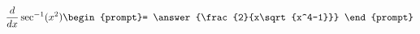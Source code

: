\documentclass{ximera}
\author{Steven Gubkin}
\begin{document}
\begin{exercise}

\[
\frac{d}{dx} \sec^{-1}(x^2) \begin{prompt}= \answer{\frac{2}{x\sqrt{x^4-1}}}
\end{prompt}
\]



\end{exercise}
\end{document}
